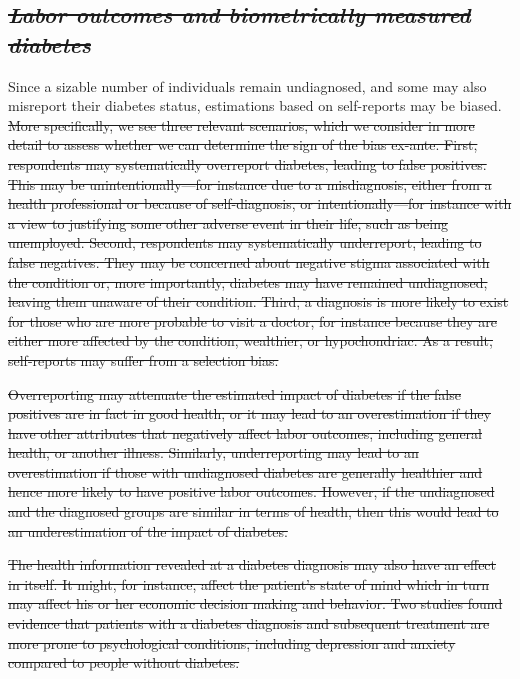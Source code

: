 \documentclass[12pt,english]{article}
\providecommand{\DIFaddtex}[1]{{\protect\color{blue}\uwave{#1}}} %
\providecommand{\DIFdeltex}[1]{{\protect\color{red}\sout{#1}}}                      %
\providecommand{\DIFaddbegin}{} %
\providecommand{\DIFaddend}{} %
\providecommand{\DIFdelbegin}{} %
\providecommand{\DIFdelend}{} %
\providecommand{\DIFadd}[1]{\texorpdfstring{\DIFaddtex{#1}}{#1}} %
\providecommand{\DIFdel}[1]{\texorpdfstring{\DIFdeltex{#1}}{}} %
\begin{document}
\subsection{\label{sec:Biomarker Strategy}\DIFdelbegin \textit{\DIFdel{Labor outcomes and biometrically measured diabetes}}%
\DIFdelend \DIFaddbegin \DIFadd{Labor outcomes and biometrically measured diabetes}\DIFaddend }

Since a sizable number of individuals remain undiagnosed, and some may also misreport their diabetes status, estimations based on self-reports may be biased. \DIFdelbegin \DIFdel{More specifically, we see three relevant scenarios, which we consider in more detail to assess whether we can determine the sign of the bias ex-ante. First, respondents may systematically overreport diabetes, leading to false positives. This may be unintentionally---for instance due to a misdiagnosis, either from a health professional or because of self-diagnosis, or intentionally---for instance with a view to justifying some other adverse event in their life, such as being unemployed. Second, respondents may systematically underreport, leading to false negatives. They may be concerned about negative stigma associated with the condition or, more importantly, diabetes may have remained undiagnosed, leaving them unaware of their condition. Third, a diagnosis is more likely to exist for those who are more probable to visit a doctor, for instance because they are either more affected by the condition, wealthier, or hypochondriac. As a result, self-reports may suffer from a selection bias.
}%

\DIFdel{Overreporting may attenuate the estimated impact of diabetes if the false positives are in fact in good health, or it may lead to an overestimation if they have other attributes that negatively affect labor outcomes, including general health, or another illness. Similarly, underreporting may lead to an overestimation if those with undiagnosed diabetes are generally healthier and hence more likely to have positive labor outcomes. However, if the undiagnosed and the diagnosed groups are similar in terms of health, then this would lead to an underestimation of the impact of diabetes. 
}%

\DIFdel{The health information revealed at a diabetes diagnosis may also have an effect in itself. It might, for instance, affect the patient's state of mind which in turn may affect his or her economic decision making and behavior. Two studies found evidence that patients with a diabetes diagnosis and subsequent treatment are more prone to psychological conditions, including depression and anxiety }%
\DIFdel{compared to people without diabetes.
}%
\end{document}
